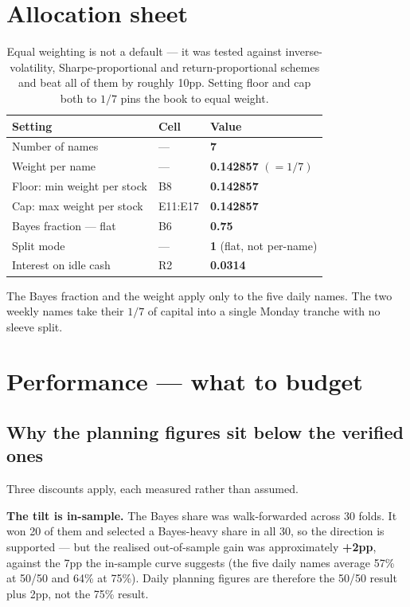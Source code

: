 \documentclass[11pt]{article}
\begin{document}
\section{Allocation sheet}

\begin{table}[H]\centering\small
\begin{tabular}{lll}
\toprule
\textbf{Setting} & \textbf{Cell} & \textbf{Value}\\
\midrule
\rowcolor{bckeep} Number of names & --- & \textbf{7}\\
Weight per name & --- & \textbf{0.142857} $(=1/7)$\\
\rowcolor{bcact} Floor: min weight per stock & B8 & \textbf{0.142857}\\
Cap: max weight per stock & E11:E17 & \textbf{0.142857}\\
\rowcolor{bckeep} Bayes fraction --- flat & B6 & \textbf{0.75}\\
Split mode & --- & \textbf{1} (flat, not per-name)\\
\rowcolor{bckeep} Interest on idle cash & R2 & \textbf{0.0314}\\
\bottomrule
\end{tabular}
\caption{Equal weighting is not a default --- it was tested against inverse-volatility,
Sharpe-proportional and return-proportional schemes and beat all of them by roughly 10pp.
Setting floor and cap both to $1/7$ pins the book to equal weight.}
\end{table}

The Bayes fraction and the weight apply only to the five daily names. The two weekly names take
their $1/7$ of capital into a single Monday tranche with no sleeve split.

\section{Performance --- what to budget}

\subsection{Why the planning figures sit below the verified ones}

Three discounts apply, each measured rather than assumed.

\textbf{The tilt is in-sample.} The Bayes share was walk-forwarded across 30 folds. It won 20 of
them and selected a Bayes-heavy share in all 30, so the direction is supported --- but the
realised out-of-sample gain was approximately \textbf{+2pp}, against the 7pp the in-sample curve
suggests (the five daily names average 57\% at 50/50 and 64\% at 75\%). Daily planning figures are
therefore the 50/50 result plus 2pp, not the 75\% result.
\end{document}
